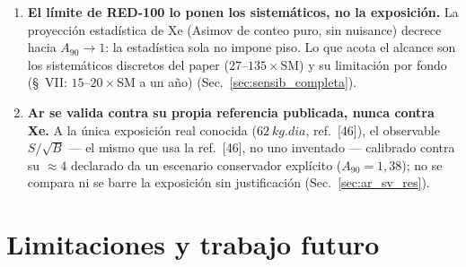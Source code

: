 \documentclass[11pt,a4paper]{article}
\begin{document}
\begin{enumerate}
    $1{,}7\%$ (esquinas) al $68\%$. CONUS+ interviene
    \'unicamente como validaci\'on del motor estad\'istico de los contornos NSI
    (Sec.~\ref{sec:conusval}), no se combina con Xe en un contorno conjunto.
  \item \textbf{El l\'imite de RED-100 lo ponen los sistem\'aticos, no la
    exposici\'on.} La proyecci\'on estad\'istica de Xe (Asimov de conteo puro,
    sin nuisance) decrece hacia $A_{90}\to1$: la estad\'istica sola no impone
    piso. Lo que acota el alcance son los sistem\'aticos discretos del paper
    ($27$--$135\times$SM) y su limitaci\'on por fondo (\S~VII: $15$--$20\times$SM
    a un a\~no) (Sec.~\ref{sec:sensib_completa}).
  \item \textbf{Ar se valida contra su propia referencia publicada, nunca contra
    Xe.} A la \'unica exposici\'on real conocida ($\SI{62}{kg.dia}$, ref.\
    {[46]}), el observable $S/\sqrt{B}$ --- el mismo que usa la ref.\ {[46]}, no
    uno inventado --- calibrado contra su $\approx4$ declarado da un escenario
    conservador expl\'icito ($A_{90}=1{,}38$); no se compara ni se barre la
    exposici\'on sin justificaci\'on (Sec.~\ref{sec:ar_sv_res}).
\end{enumerate}

\section{Limitaciones y trabajo futuro}
\label{sec:limitaciones}
\end{document}
